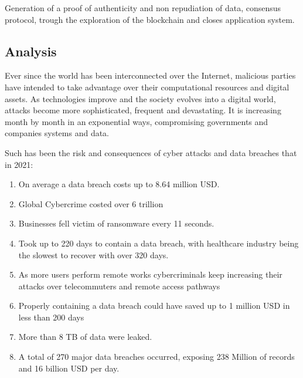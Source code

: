 \documentclass[a4paper]{article}
\begin{document}
Generation of a proof of authenticity and non repudiation of data, consensus protocol, trough the exploration of the blockchain and closes application system.

\subsection{Analysis}

Ever since the world has been interconnected over the Internet, malicious parties have intended to take advantage over their computational resources and digital assets. As technologies improve and the society evolves into a digital world, attacks become more sophisticated, frequent and devastating. It is increasing month by month in an exponential ways, compromising governments and companies systems and data. 

Such has been the risk and consequences of cyber attacks and data breaches that in 2021\cite{10DataBreaches:online}:
\begin{enumerate}
    \item On average a data breach costs up to 8.64 million USD.
    \item Global Cybercrime costed over 6 trillion
    \item Businesses fell victim of ransomware every 11 seconds.
    \item Took up to 220 days to contain a data breach, with healthcare industry being the slowest to recover with over 320 days.
    \item  As more users perform remote works cybercriminals keep increasing their attacks over telecommuters and remote access pathways
    \item Properly containing a data breach could have saved up to 1 million USD in less than 200 days
    \item More than 8 TB of data were leaked.
    \item A total of 270 major data breaches occurred, exposing 238 Million of records and 16 billion USD per day.
\end{enumerate}
\end{document}
